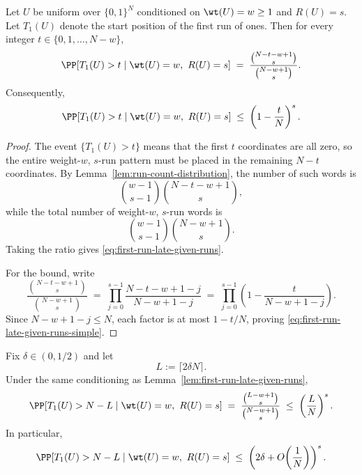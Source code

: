 \begin{lemma}
\label{lem:first-run-late-given-runs}
Let $U$ be uniform over $\{0,1\}^N$ conditioned on $\wt(U)=w\ge 1$ and $R(U)=s$.
Let $T_1(U)$ denote the start position of the first run of ones.
Then for every integer $t\in\{0,1,\dots,N-w\}$,
\begin{equation}
\label{eq:first-run-late-given-runs}
\PP[T_1(U)>t \mid \wt(U)=w,\ R(U)=s]
\;=\;
\frac{\binom{N-t-w+1}{s}}{\binom{N-w+1}{s}}.
\end{equation}
Consequently,
\begin{equation}
\label{eq:first-run-late-given-runs-simple}
\PP[T_1(U)>t \mid \wt(U)=w,\ R(U)=s]
\;\le\;
\left(1-\frac{t}{N}\right)^s.
\end{equation}
\end{lemma}

\begin{proof}
The event $\{T_1(U)>t\}$ means that the first $t$ coordinates are all zero, so the entire weight-$w$, $s$-run pattern
must be placed in the remaining $N-t$ coordinates. By Lemma~\ref{lem:run-count-distribution}, the number of such words is
\[
\binom{w-1}{s-1}\binom{N-t-w+1}{s},
\]
while the total number of weight-$w$, $s$-run words is
\[
\binom{w-1}{s-1}\binom{N-w+1}{s}.
\]
Taking the ratio gives \eqref{eq:first-run-late-given-runs}.

For the bound, write
\[
\frac{\binom{N-t-w+1}{s}}{\binom{N-w+1}{s}}
\;=\;
\prod_{j=0}^{s-1}\frac{N-t-w+1-j}{N-w+1-j}
\;=\;
\prod_{j=0}^{s-1}\left(1-\frac{t}{N-w+1-j}\right).
\]
Since $N-w+1-j\le N$, each factor is at most $1-t/N$, proving
\eqref{eq:first-run-late-given-runs-simple}.
\end{proof}

\begin{corollary}
\label{cor:first-run-late-qbase}
Fix $\delta\in(0,1/2)$ and let
\[
L:=\lceil 2\delta N\rceil.
\]
Under the same conditioning as Lemma~\ref{lem:first-run-late-given-runs},
\begin{equation}
\label{eq:first-run-late-qbase}
\PP[T_1(U)>N-L \mid \wt(U)=w,\ R(U)=s]
\;=\;
\frac{\binom{L-w+1}{s}}{\binom{N-w+1}{s}}
\;\le\;
\left(\frac{L}{N}\right)^s.
\end{equation}
In particular,
\begin{equation}
\label{eq:first-run-late-qbase-asym}
\PP[T_1(U)>N-L \mid \wt(U)=w,\ R(U)=s]
\;\le\;
\left(2\delta + O\!\left(\frac{1}{N}\right)\right)^s.
\end{equation}
\end{corollary}

